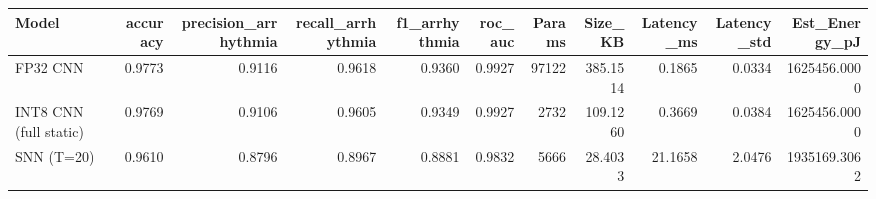 \begin{tabular}{lrrrrrrrrrr}
\toprule
Model & accuracy & precision_arrhythmia & recall_arrhythmia & f1_arrhythmia & roc_auc & Params & Size_KB & Latency_ms & Latency_std & Est_Energy_pJ \\
\midrule
FP32 CNN & 0.9773 & 0.9116 & 0.9618 & 0.9360 & 0.9927 & 97122 & 385.1514 & 0.1865 & 0.0334 & 1625456.0000 \\
INT8 CNN (full static) & 0.9769 & 0.9106 & 0.9605 & 0.9349 & 0.9927 & 2732 & 109.1260 & 0.3669 & 0.0384 & 1625456.0000 \\
SNN (T=20) & 0.9610 & 0.8796 & 0.8967 & 0.8881 & 0.9832 & 5666 & 28.4033 & 21.1658 & 2.0476 & 1935169.3062 \\
\bottomrule
\end{tabular}
